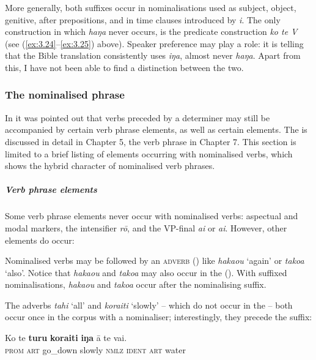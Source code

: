 More generally, both suffixes occur in nominalisations used as subject, object, genitive, after prepositions, and in time clauses introduced by \textit{{\ꞌ}i}. The only construction in which \textit{haŋa} never occurs, is the predicate construction \textit{ko te V} (see (\ref{ex:3.24}–\ref{ex:3.25}) above). Speaker preference may play a role: it is telling that the Bible translation consistently uses \textit{iŋa}, almost never \textit{haŋa}. Apart from this, I have not been able to find a distinction between the two.

\subsubsection[The nominalised phrase]{The nominalised phrase}\label{sec:3.2.3.3}

In  it was pointed out that verbs preceded by a determiner may still be accompanied by certain verb phrase elements, as well as certain  elements. The  is discussed in detail in Chapter 5, the verb phrase in Chapter 7. This section is limited to a brief listing of elements occurring with nominalised verbs, which shows the hybrid character of nominalised verb phrases.

\subparagraph{Verb phrase elements} Some verb phrase elements never occur with nominalised verbs: aspectual and modal markers, the intensifier \textit{rō}, and the VP{}-final  \textit{ai} or \textit{{\ꞌ}ai}. However, other elements do occur:

Nominalised verbs may be followed by an \textsc{adverb} () like \textit{haka{\ꞌ}ou} ‘again’ or \textit{\mbox{tako{\ꞌ}a}} ‘also’. Notice that \textit{haka{\ꞌ}ou} and \textit{tako{\ꞌ}a} may also occur in the  (). With suffixed nominalisations, \textit{haka{\ꞌ}ou} and \textit{tako{\ꞌ}a} occur after the nominalising suffix. 

The adverbs \textit{tahi} ‘all’ and \textit{kora{\ꞌ}iti} ‘slowly’ – which do not occur in the  – both occur once in the corpus with a nominaliser; interestingly, they precede the suffix:

\ea\label{ex:3.52}
\gll Ko te \textbf{turu} \textbf{kora{\ꞌ}iti} \textbf{iŋa} {\ꞌ}ā te vai.\\
\textsc{prom} \textsc{art} go\_down slowly \textsc{nmlz} \textsc{ident} \textsc{art} water\\

